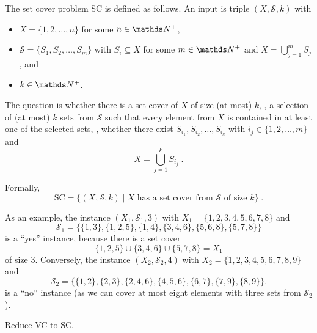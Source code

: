 \documentclass{exercise}
\begin{document}
\subtask The set cover problem SC is defined as follows.  An input is triple
  $(X,\mathcal{S},k)$ with 
  \begin{itemize}
    \item $X=\{1,2,\dots,n\}$ for some $n\in\nat^+$,
    \item $\mathcal{S}=\{S_1,S_2,\dots,S_m\}$ with $S_i\subseteq X$ for some $m\in\nat^+$ and $X=\bigcup_{j=1}^m S_j$, and
    \item $k\in\nat^+$.
  \end{itemize}
	The question is whether there is a set cover of $X$ of size (at most) $k$,
	\ie, a selection of (at most) $k$ sets from $\mathcal{S}$ such that every
	element from $X$ is contained in at least one of the selected sets, \ie,
	whether there exist $S_{i_1},S_{i_2},\dots,S_{i_k}$ with
	$i_j\in\{1,2,\dots,m\}$ and
  \[ X=\bigcup_{j=1}^k S_{i_j}\;. \]
 
  Formally,
  \[ \text{SC} = \{(X,\mathcal{S},k) \mid X \text{ has a set cover from } \mathcal{S} \text{ of size } k\}\;. \]
  
  As an example, the instance $(X_1,\mathcal{S}_1,3)$ with $X_1=\{1,2,3,4,5,6,7,8\}$ and
  \[ \mathcal{S}_1 = \big\{ \{1,3\}, \{1,2,5\}, \{1,4\}, \{3,4,6\}, \{5,6,8\}, \{5,7,8\} \big\} \]
  is a ``yes'' instance, because there is a set cover
  \[ \{1,2,5\} \cup \{3,4,6\}\cup \{5,7,8\} = X_1 \]
  of size $3$.  Conversely, the instance $(X_2,\mathcal{S}_2,4)$ with $X_2=\{1,2,3,4,5,6,7,8,9\}$
  and
  \[ \mathcal{S}_2 = \big\{\{1,2\}, \{2,3\}, \{2,4,6\}, \{4,5,6\}, \{6,7\}, \{7,9\}, \{8,9\} \big\}. \]
  is a ``no'' instance (as we can cover at most eight elements with three sets from $\mathcal{S}_2$).

  Reduce VC to SC.
\end{document}

